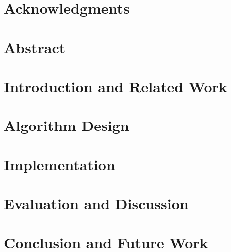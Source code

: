 \documentclass[10pt,a4paper,openany,oneside]{report}
\begin{document}

\setcounter{page}{2}

\chapter*{Acknowledgments}


\chapter*{Abstract}


\renewcommand{\contentsname}{Contents}
\tableofcontents

\chapter{Introduction and Related Work}
\label{ch:introduction}


\chapter{Algorithm Design}
\label{ch:design}


\chapter{Implementation}
\label{ch:implementation}


\chapter{Evaluation and Discussion}
\label{ch:evaluation}


\chapter{Conclusion and Future Work}
\label{ch:conclusion}


\renewcommand{\bibname}{Bibliography}
\clearpage
{}
{}
\nocite{*}


\end{document}
